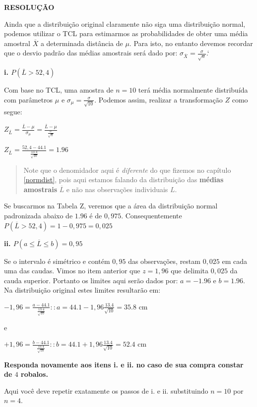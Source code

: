 \documentclass[
]{book}
\begin{document}
\textbf{RESOLUÇÃO}

Ainda que a distribuição original claramente não siga uma distribuição normal, podemos utilizar o TCL para estimarmos as probabilidades de obter uma média amostral \(\overline{X}\) a determinada distância de \(\mu\). Para isto, no entanto devemos recordar que o desvio padrão das médias amostrais será dado por: \(\sigma_{\overline{X}} = \frac{\sigma}{\sqrt{n}}\).`

\textbf{i. \(P(\overline{L} > 52,4)\)}

Com base no TCL, uma amostra de \(n = 10\) terá média normalmente distribuída com parâmetros \(\mu\) e \(\sigma_{\mu} = \frac{\sigma}{\sqrt{10}}\). Podemos assim, realizar a transformação \(Z\) como segue:

\(Z_{\overline{L}} = \frac{\overline{L} - \mu}{\sigma_{\mu}} = \frac{\overline{L} - \mu}{\frac{\sigma}{\sqrt{n}}}\)

\(Z_{\overline{L}} = \frac{52,4 - 44.1}{\frac{13.4}{\sqrt{10}}} = 1.96\)

\begin{quote}
Note que o denomidador aqui é \emph{diferente} do que fizemos no capítulo \ref{normdist}, pois aqui estamos falando da distribuição das \textbf{médias amostrais} \(\overline{L}\) e não nas observações individuais \(L\).
\end{quote}

Se buscarmos na Tabela Z, veremos que a área da distribuição normal padronizada abaixo de \(1.96\) é de \(0,975\). Consequentemente \(P(\overline{L} > 52,4) = 1 - 0,975 = 0,025\)

\textbf{ii. \(P(a \le \overline{L} \le b) = 0,95\)}

Se o intervalo é simétrico e contém \(0,95\) das observações, restam \(0,025\) em cada uma das caudas. Vimos no item anterior que \(z = 1,96\) que delimita \(0,025\) da cauda superior. Portanto os limites aqui serão dados por: \(a = -1.96\) e \(b = 1.96\). Na distribuição original estes limites resultarão em:

\(-1,96 = \frac{a - 44.1}{\frac{13.4}{\sqrt{10}}}:: a = 44.1 -1,96 \frac{13.4}{\sqrt{10}} = 35.8\) cm

e

\(+1,96 = \frac{b - 44.1}{\frac{13.4}{\sqrt{10}}}:: b = 44.1 +1,96 \frac{13.4}{\sqrt{10}} = 52.4\) cm

\textbf{Responda novamente aos itens i. e ii. no caso de sua compra constar de \(4\) robalos.}

Aqui você deve repetir exatamente os passos de i. e ii. substituindo \(n = 10\) por \(n = 4\).
\end{document}
